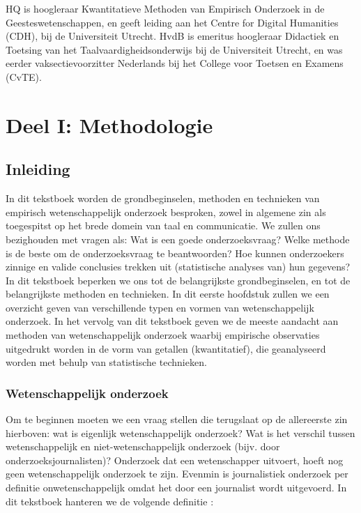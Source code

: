 \documentclass[
]{book}
\begin{document}
HQ is hoogleraar Kwantitatieve Methoden van Empirisch Onderzoek in de Geesteswetenschappen, en geeft leiding aan het Centre for Digital Humanities (CDH), bij de Universiteit Utrecht.
HvdB is emeritus hoogleraar Didactiek en Toetsing van het Taalvaardigheidsonderwijs bij de Universiteit Utrecht, en was eerder vaksectievoorzitter Nederlands bij het College voor Toetsen en Examens (CvTE).

\part*{Deel I: Methodologie}\label{part-deel-i-methodologie}

\chapter{Inleiding}\label{ch-inleiding}

In dit tekstboek worden de grondbeginselen, methoden en technieken van
empirisch wetenschappelijk onderzoek besproken, zowel in algemene zin
als toegespitst op het brede domein van taal en communicatie. We zullen ons bezighouden met vragen als: Wat is een goede onderzoeksvraag? Welke methode is de beste om de onderzoeksvraag te beantwoorden? Hoe kunnen onderzoekers zinnige en valide conclusies trekken uit (statistische analyses van) hun gegevens? In dit tekstboek beperken we ons tot de belangrijkste grondbeginselen, en tot de belangrijkste methoden en technieken. In dit eerste hoofdstuk zullen we een overzicht geven van verschillende typen en vormen van wetenschappelijk onderzoek. In het vervolg van dit tekstboek geven we de meeste aandacht aan methoden van wetenschappelijk onderzoek waarbij empirische observaties uitgedrukt worden in de vorm van getallen (kwantitatief), die geanalyseerd worden met behulp van statistische technieken.

\section{Wetenschappelijk onderzoek}\label{sec:wetenschappelijk-onderzoek}

Om te beginnen moeten we een vraag stellen die terugslaat op de
allereerste zin hierboven: wat is eigenlijk wetenschappelijk onderzoek?
Wat is het verschil tussen wetenschappelijk en niet-wetenschappelijk
onderzoek (bijv. door onderzoeksjournalisten)? Onderzoek dat een
wetenschapper uitvoert, hoeft nog geen wetenschappelijk onderzoek te
zijn. Evenmin is journalistiek onderzoek per definitie
onwetenschappelijk omdat het door een journalist wordt uitgevoerd. In
dit tekstboek hanteren we de volgende definitie \citep[p.14]{KL00}:
\end{document}
